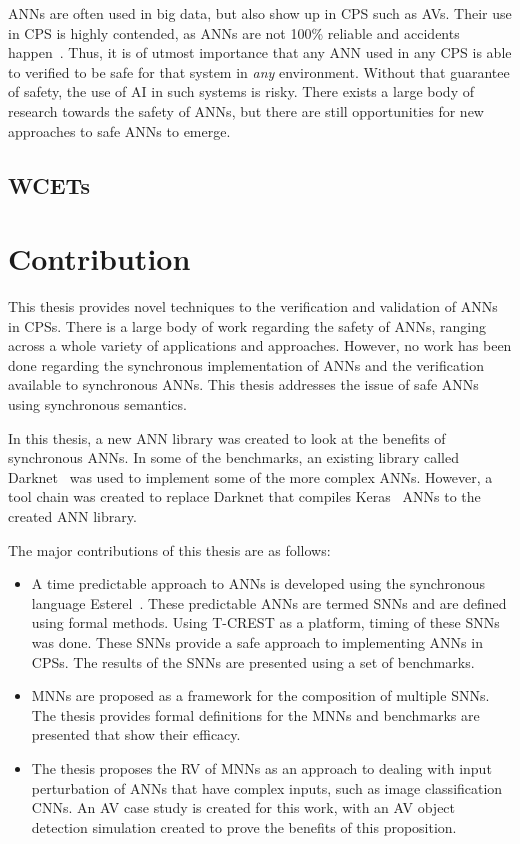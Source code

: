 \acp{ANN} are often used in big data, but also show up in \ac{CPS} such as \acfp{AV}.
Their use in \ac{CPS} is highly contended, as \acp{ANN} are not 100\% reliable and accidents happen~\cite{coldewey_2018}.
Thus, it is of utmost importance that any \ac{ANN} used in any \ac{CPS} is able to verified to be safe for that system in \textit{any} environment.
Without that guarantee of safety, the use of \ac{AI} in such systems is risky.
There exists a large body of research towards the safety of \acp{ANN}, but there are still opportunities for new approaches to safe \acp{ANN} to emerge.

\subsection{\acfp{WCET}}

\section{Contribution}
This thesis provides novel techniques to the verification and validation of \acfp{ANN} in \acfp{CPS}.
There is a large body of work regarding the safety of \acp{ANN}, ranging across a whole variety of applications and approaches.
However, no work has been done regarding the synchronous implementation of \acp{ANN} and the verification available to synchronous \acp{ANN}.  
This thesis addresses the issue of safe \acp{ANN} using synchronous semantics.

In this thesis, a new \ac{ANN} library was created to look at the benefits of synchronous \acp{ANN}.
In some of the benchmarks, an existing library called Darknet~\cite{darknet13} was used to implement some of the more complex \acp{ANN}.
However, a tool chain was created to replace Darknet that compiles Keras~\cite{chollet2015keras} \acp{ANN} to the created \ac{ANN} library.

The major contributions of this thesis are as follows:
\begin{itemize}
	\item A time predictable approach to \acp{ANN} is developed using the synchronous language Esterel~\cite{berry2000foundations}. These predictable \acp{ANN} are termed \acfp{SNN} and are defined using formal methods. Using T-CREST as a platform, timing of these \acp{SNN} was done. These \acp{SNN} provide a safe approach to implementing \acp{ANN} in \acp{CPS}. The results of the \acp{SNN} are presented using a set of benchmarks. 
	\item \acfp{MNN} are proposed as a framework for the composition of multiple \acp{SNN}. The thesis provides formal definitions for the \acp{MNN} and benchmarks are presented that show their efficacy. 
	\item The thesis proposes the \acf{RV} of \acp{MNN} as an approach to dealing with input perturbation of \acp{ANN} that have complex inputs, such as image classification \acfp{CNN}. An \acf{AV} case study is created for this work, with an \ac{AV} object detection simulation created to prove the benefits of this proposition. 
\end{itemize}


